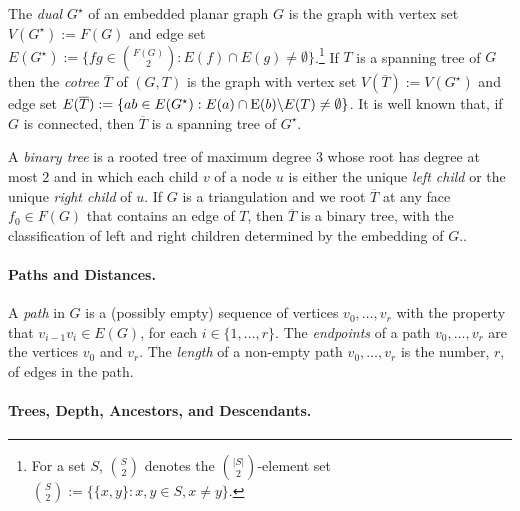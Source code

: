 \documentclass{patmorin}
\DeclareMathOperator{\dist}{dist}
\begin{document}
The \emph{dual} $G^\star$ of an embedded planar graph $G$ is the graph with vertex set $V(G^\star):=F(G)$ and edge set $E(G^{\star}):=\{fg\in \binom{F(G)}{2}:E(f)\cap E(g)\neq\emptyset\}$.\footnote{For a set $S$, $\binom{S}{2}$ denotes the $\binom{|S|}{2}$-element set $\binom{S}{2}:=\{\{x,y\}:x,y\in S, x\neq y\}$.} If $T$ is a spanning tree of $G$ then the \emph{cotree} $\overline{T}$ of $(G,T)$ is the graph with vertex set $V(\overline{T}) := V(G^\star)$ and edge set $E(\overline{T}) := \{ab \in E(G^\star) : E(a) \cap \mathrm{E}(b) \backslash E(T) \neq \emptyset \}$. It is well known that, if $G$ is connected, then $\overline{T}$ is a spanning tree of $G^\star$.

A \emph{binary tree} is a rooted tree of maximum degree $3$ whose root has degree at most $2$ and in which each child $v$ of a node $u$ is either the unique \emph{left child} or the unique \emph{right child} of $u$.  If $G$ is a triangulation  and we root $\overline{T}$ at any face $f_0\in F(G)$ that contains an edge of $T$, then $\overline{T}$ is a binary tree, with the classification of left and right children determined by the embedding of $G$.. 


\paragraph{Paths and Distances.}

A \emph{path} in $G$ is a (possibly empty) sequence of vertices $v_0,\ldots,v_r$ with the property that $v_{i-1}v_i\in E(G)$, for each $i\in\{1,\ldots,r\}$.  The \emph{endpoints} of a path $v_0,\ldots,v_r$ are the vertices $v_0$ and $v_r$.
The \emph{length} of a non-empty path $v_0,\ldots,v_r$ is the number, $r$, of edges in the path.
%

\paragraph{Trees, Depth, Ancestors, and Descendants.}
\end{document}
